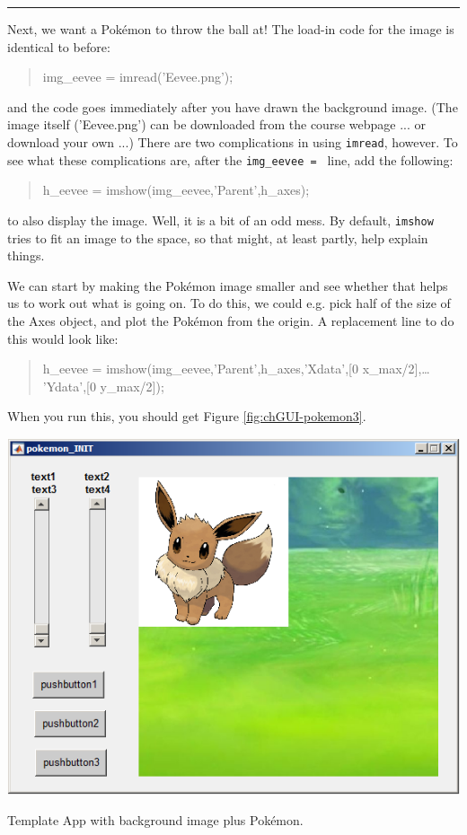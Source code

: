 \documentclass{tufte-book} %
\newenvironment{docspec}{\begin{quotation}\ttfamily\parskip0pt\parindent0pt\ignorespaces}{\end{quotation}}
\begin{document}
\vspace{1mm}
\noindent\rule{4cm}{0.5pt}
\vspace{2mm}

\noindent Next, we want a Pok\'emon to throw the ball at! The load-in code for the image is identical to before:
\begin{docspec}
img\_eevee = imread(\textcolor[rgb]{0.501961,0,1}{'Eevee.png'});
\end{docspec}
and the code goes immediately after you have drawn the background image. (The image itself ('\textsf{Eevee.png}') can be downloaded from the course webpage ... or download your own ...) There are two complications in using \texttt{imread}, however. To see what these complications are, after the \texttt{img\_eevee = } line, add the following:
\begin{docspec}
h\_eevee = imshow(img\_eevee,\textcolor[rgb]{0.501961,0,1}{'Parent'},h\_axes);
\end{docspec}
to also display the image. Well, it is a bit of an odd mess. By default, \texttt{imshow} tries to fit an image to the space, so that might, at least partly, help explain things.

We can start by making the Pok\'emon image smaller and see whether that helps us to work out what is going on. To do this, we could e.g. pick half of the size of the \textsf{Axes} object, and plot the Pok\'emon from the origin. A replacement line to do this would look like: 
\begin{docspec}
h\_eevee = imshow(img\_eevee,\textcolor[rgb]{0.501961,0,1}{'Parent'},h\_axes,\textcolor[rgb]{0.501961,0,1}{'Xdata'},[0 x\_max/2],\ldots
\\\textcolor[rgb]{0.501961,0,1}{'Ydata'},[0 y\_max/2]);
\end{docspec}
When you run this, you should get Figure \ref{fig:chGUI-pokemon3}. 

\begin{marginfigure}[0.0in]
\includegraphics[width=\linewidth]{chGUI-pokemon3.png}
\caption{Template App with background image plus Pok\'emon.}
\label{fig:chGUI-pokemon3}
\end{marginfigure}
\end{document}
